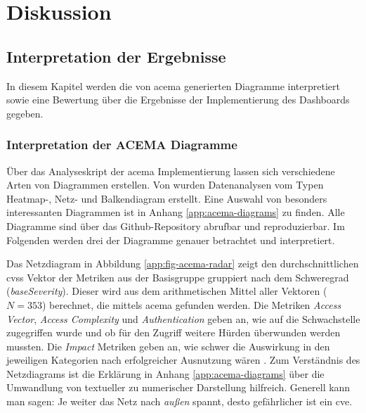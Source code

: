 \chapter{Diskussion}
\label{chap:diskussion}
\section{Interpretation der Ergebnisse}
\label{sec:interpretation}
In diesem Kapitel werden die von \gls{acema} generierten Diagramme interpretiert sowie eine Bewertung über die Ergebnisse der Implementierung des Dashboards gegeben.
\subsection{Interpretation der ACEMA Diagramme}
\label{sec:interpretation-acema}
Über das Analyseskript der \gls{acema} Implementierung lassen sich verschiedene Arten von Diagrammen erstellen. Von \citeauthor{klementSecuring6GTransition2024} wurden Datenanalysen vom Typen Heatmap-, Netz- und Balkendiagram erstellt. Eine Auswahl von besonders interessanten Diagrammen ist in Anhang \ref{app:acema-diagrams} zu finden. Alle Diagramme sind über das Github-Repository \autocite{jesseDumpeldownAcema_oranDev} abrufbar und reproduzierbar. Im Folgenden werden drei der Diagramme genauer betrachtet und interpretiert.
\par Das Netzdiagram in Abbildung \ref{app:fig-acema-radar} zeigt den durchschnittlichen \gls{cvss} Vektor der Metriken aus der Basisgruppe gruppiert nach dem Schweregrad (\textit{baseSeverity}). Dieser wird aus dem arithmetischen Mittel aller Vektoren (\(N = 353\)) berechnet, die mittels \gls{acema} gefunden werden. Die Metriken \textit{Access Vector}, \textit{Access Complexity} und \textit{Authentication} geben an, wie auf die Schwachstelle zugegriffen wurde und ob für den Zugriff weitere Hürden überwunden werden mussten. Die \textit{Impact} Metriken geben an, wie schwer die Auswirkung in den jeweiligen Kategorien nach erfolgreicher Ausnutzung wären \autocite{CVSSV2Complete}. Zum Verständnis des Netzdiagrams ist die Erklärung in Anhang \ref{app:acema-diagrams} über die Umwandlung von textueller zu numerischer Darstellung hilfreich. Generell kann man sagen: Je weiter das Netz nach \textit{außen} spannt, desto gefährlicher ist ein \gls{cve}. 
